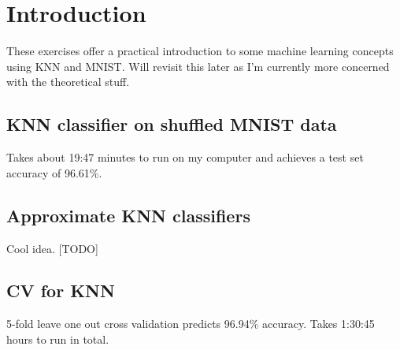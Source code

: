 \section{Introduction}
These exercises offer a practical introduction to some machine learning concepts using KNN and MNIST. Will revisit this later as I'm currently more concerned with the theoretical stuff.
\subsection{KNN classifier on shuffled MNIST data}
Takes about 19:47 minutes to run on my computer and achieves a test set accuracy of 96.61\%.
\subsection{Approximate KNN classifiers}
Cool idea. [TODO]
\subsection{CV for KNN}
5-fold leave one out cross validation predicts 96.94\% accuracy. Takes 1:30:45 hours to run in total.